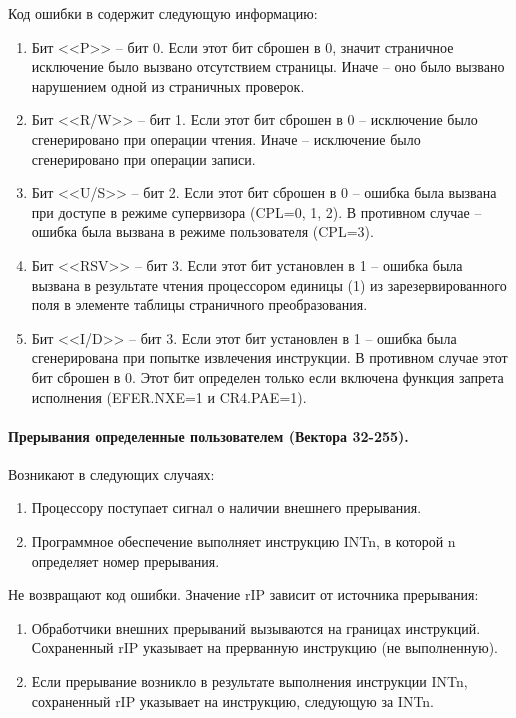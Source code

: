 Код ошибки в содержит следующую информацию:
\begin{enumerate}[1.]
\item Бит <<P>> -- бит 0. Если этот бит сброшен в 0, значит страничное исключение было
вызвано отсутствием страницы. Иначе -- оно было вызвано нарушением одной из
страничных проверок.
\item Бит <<R/W>> -- бит 1. Если этот бит сброшен в 0 -- исключение было сгенерировано
при операции чтения. Иначе -- исключение было сгенерировано при операции записи.
\item Бит <<U/S>> -- бит 2. Если этот бит сброшен в 0 -- ошибка была вызвана при
доступе в режиме супервизора (CPL=0, 1, 2). В противном случае -- ошибка была
вызвана в режиме пользователя (CPL=3).
\item Бит <<RSV>> -- бит 3. Если этот бит установлен в 1 -- ошибка была вызвана в
результате чтения процессором единицы (1) из зарезервированного поля в
элементе таблицы страничного преобразования.
\item Бит <<I/D>> -- бит 3. Если этот бит установлен в 1 -- ошибка была сгенерирована
при попытке извлечения инструкции. В противном случае этот бит
сброшен в 0. Этот бит определен только если включена функция запрета
исполнения (EFER.NXE=1 и CR4.PAE=1).
\end{enumerate}


\paragraph{Прерывания определенные пользователем (Вектора 32-255).}
Возникают в следующих случаях:
\begin{enumerate}[1.]
\item Процессору поступает сигнал о наличии внешнего прерывания.
\item Программное обеспечение выполняет инструкцию INTn, в которой n
определяет номер прерывания.
\end{enumerate}

Не возвращают код ошибки. Значение rIP зависит от источника прерывания:
\begin{enumerate}[1.]
\item Обработчики внешних прерываний вызываются на границах инструкций. Сохраненный rIP
	указывает на прерванную инструкцию (не выполненную).
\item Если прерывание возникло в результате выполнения инструкции INTn,
сохраненный rIP указывает на инструкцию, следующую за INTn.
\end{enumerate}

